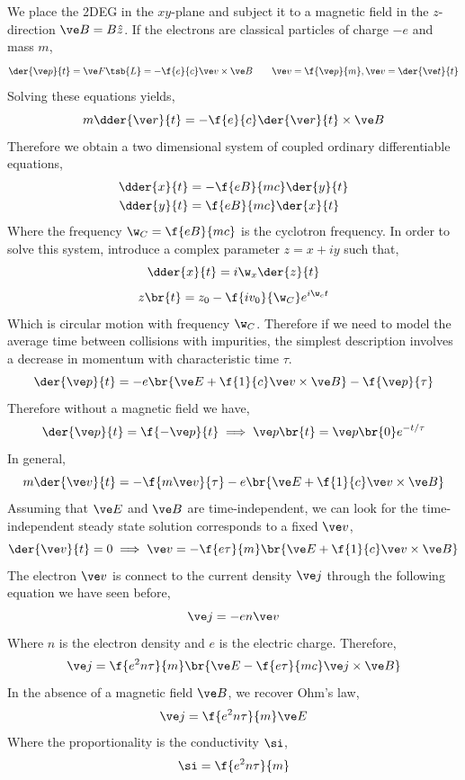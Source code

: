 \documentclass{article}
\begin{document}
We place the 2DEG in the $xy$-plane and subject it to a magnetic field in the $z$-direction $\ve B = B \hat z$. If the electrons are classical particles of charge $-e$ and mass $m$,
\[ \der{\ve p}{t} = \ve F\tsb{L} = - \f{e}{c}\ve v \times \ve B \qquad \ve v = \f{\ve p}{m}, \ve v = \der{\ve t}{t} \]
Solving these equations yields,
\[ m \dder{\ve r}{t} = - \f{e}{c} \der{\ve r}{t} \times \ve B  \]
Therefore we obtain a two dimensional system of coupled ordinary differentiable equations,
\begin{align*}
\dder{x}{t} &= - \f{eB}{mc} \der{y}{t} \\
\dder{y}{t} &= \f{eB}{mc} \der{x}{t}
\end{align*}
Where the frequency $\w_C = \f{eB}{mc}$ is the cyclotron frequency. In order to solve this system, introduce a complex parameter $z = x + i y$ such that,
\[ \dder{x}{t} = i \w_x \der{z}{t} \]
\[ z\br{t} = z_0 - \f{i v_0}{\w_C}e^{i \w_c t}  \]
Which is circular motion with frequency $\w_C$. Therefore if we need to model the average time between collisions with impurities, the simplest description involves a decrease in momentum with characteristic time $\tau$.
\[ \der{\ve p}{t} = - e \br{\ve E + \f{1}{c} \ve v \times \ve B} - \f{\ve p}{\tau} \]
Therefore without a magnetic field we have,
\[ \der{\ve p}{t} = \f{- \ve p}{t} \implies \ve p\br{t} = \ve p\br{0} e^{- t/\tau} \]
In general,
\[ m\der{\ve v}{t} = - \f{m \ve v}{\tau} - e\br{\ve E + \f{1}{c} \ve v \times \ve B} \]
Assuming that $\ve E$ and $\ve B$ are time-independent, we can look for the time-independent steady state solution corresponds to a fixed $\ve v$,
\[ \der{\ve v}{t} = 0 \implies \ve v = -\f{e \tau}{m} \br{\ve E + \f{1}{c} \ve v \times \ve B} \]
The electron $\ve v$ is connect to the current density $\ve j$ through the following equation we have seen before,
\[ \ve j = - e n \ve v \]
Where $n$ is the electron density and $e$ is the electric charge. Therefore,
\[ \ve j = \f{e^2 n \tau}{m} \br{\ve E - \f{e \tau}{m c} \ve j \times \ve B} \]
In the absence of a magnetic field $\ve B$, we recover Ohm's law,
\[ \ve j = \f{e^2 n \tau}{m} \ve E \]
Where the proportionality is the conductivity $\si$,
\[ \si = \f{e^2 n \tau}{m} \]
\end{document}
